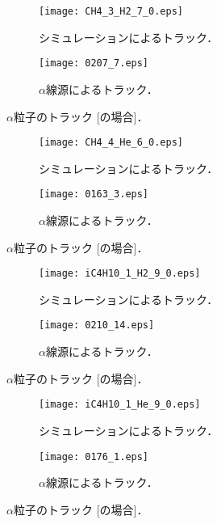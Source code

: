 \documentclass[../master]{subfiles}
\begin{document}
\begin{figure}
  \centering
  \begin{subfigure}{0.48\columnwidth}
    \centering
    \texttt{[image: CH4\_3\_H2\_7\_0.eps]}
    \caption{シミュレーションによるトラック．}
  \end{subfigure}
  \begin{subfigure}{0.48\columnwidth}
    \centering
    \texttt{[image: 0207\_7.eps]}
    \caption{$\alpha$線源によるトラック．}
  \end{subfigure}
  \caption{$\alpha$粒子のトラック [\MethaneHydro の場合]．}
  \label{fig::track_comp_ch4_h2}
\end{figure}

\begin{figure}
  \centering
  \begin{subfigure}{0.48\columnwidth}
    \centering
    \texttt{[image: CH4\_4\_He\_6\_0.eps]}
    \caption{シミュレーションによるトラック．}
  \end{subfigure}
  \begin{subfigure}{0.48\columnwidth}
    \centering
    \texttt{[image: 0163\_3.eps]}
    \caption{$\alpha$線源によるトラック．}
  \end{subfigure}
  \caption{$\alpha$粒子のトラック [\MethaneHerium の場合]．}
  \label{fig::track_comp_ch4_he}
\end{figure}

\begin{figure}
  \centering
  \begin{subfigure}{0.48\columnwidth}
    \centering
    \texttt{[image: iC4H10\_1\_H2\_9\_0.eps]}
    \caption{シミュレーションによるトラック．}
  \end{subfigure}
  \begin{subfigure}{0.48\columnwidth}
    \centering
    \texttt{[image: 0210\_14.eps]}
    \caption{$\alpha$線源によるトラック．}
  \end{subfigure}
  \caption{$\alpha$粒子のトラック [\isoButaneHydro の場合]．}
  \label{fig::track_comp_ic4h10_h2}
\end{figure}

\begin{figure}
  \centering
  \begin{subfigure}{0.48\columnwidth}
    \centering
    \texttt{[image: iC4H10\_1\_He\_9\_0.eps]}
    \caption{シミュレーションによるトラック．}
  \end{subfigure}
  \begin{subfigure}{0.48\columnwidth}
    \centering
    \texttt{[image: 0176\_1.eps]}
    \caption{$\alpha$線源によるトラック．}
  \end{subfigure}
  \caption{$\alpha$粒子のトラック [\isoButaneHerium の場合]．}
  \label{fig::track_comp_ic4h10_he}
\end{figure}
\end{document}
